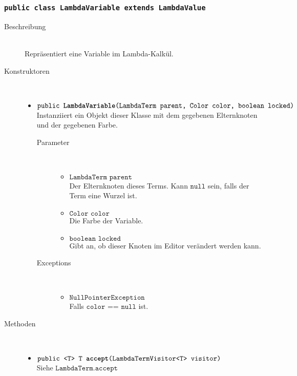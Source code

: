 \subsubsection{\normalfont \texttt{public class \textbf{LambdaVariable} extends LambdaValue}}

\begin{description}
\item[Beschreibung] \hfill \\ Repräsentiert eine Variable im Lambda-Kalkül.

\item[Konstruktoren] \hfill \\
	\vspace{-.8cm}
	\begin{itemize}
		\item $\texttt{public \textbf{LambdaVariable}(LambdaTerm parent, Color color, boolean locked)}$ \\ Instanziiert ein Objekt dieser Klasse mit dem gegebenen Elternknoten und der gegebenen Farbe.
		\begin{description}
			\item[Parameter] \hfill \\
			\vspace{-.8cm}
			\begin{itemize}
				\item $\texttt{LambdaTerm parent}$ \\ Der Elternknoten dieses Terms. Kann $\texttt{null}$ sein, falls der Term eine Wurzel ist.
				\item $\texttt{Color color}$ \\ Die Farbe der Variable.
				\item $\texttt{boolean locked}$ \\ Gibt an, ob dieser Knoten im Editor verändert werden kann.
			\end{itemize}
			\item[Exceptions] \hfill \\
			\vspace{-.8cm}
			\begin{itemize}
				\item $\texttt{NullPointerException}$ \\ Falls $\texttt{color == null}$ ist.
			\end{itemize}
		\end{description}
	\end{itemize}
	
\item[Methoden] \hfill \\
	\vspace{-.8cm}
	\begin{itemize}
		\item $\texttt{public <T> T \textbf{accept}(LambdaTermVisitor<T> visitor)}$ \\ Siehe $\texttt{LambdaTerm.accept}$
	\end{itemize}
	

\end{description}
